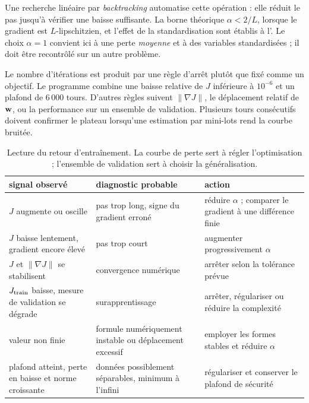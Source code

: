 Une recherche linéaire par \emph{backtracking} automatise cette opération : elle
réduit le pas jusqu'à vérifier une baisse suffisante. La borne théorique
$\alpha<2/L$, lorsque le gradient est $L$-lipschitzien, et l'effet de la
standardisation sont établis à l'. Le choix
$\alpha=1$ convient ici à une perte \emph{moyenne} et à des variables
standardisées ; il doit être recontrôlé sur un autre problème.

Le nombre d'itérations est produit par une règle d'arrêt plutôt que fixé comme
un objectif. Le programme combine une baisse relative de $J$ inférieure à
$10^{-6}$ et un plafond de $6\,000$ tours. D'autres règles suivent
$\|\nabla J\|$, le déplacement relatif de $\mathbf{w}$, ou la performance sur un
ensemble de validation. Plusieurs tours consécutifs doivent confirmer le
plateau lorsqu'une estimation par mini-lots rend la courbe bruitée.

\begin{table}[htbp]
\centering
\small
\begin{tabularx}{\textwidth}{
  >{\raggedright\arraybackslash}p{43mm}
  >{\raggedright\arraybackslash}p{53mm}
  >{\raggedright\arraybackslash}X}
\toprule
signal observé & diagnostic probable & action \\
\midrule
$J$ augmente ou oscille &
  pas trop long, signe du gradient erroné &
  réduire $\alpha$ ; comparer le gradient à une différence finie \\
$J$ baisse lentement, gradient encore élevé &
  pas trop court &
  augmenter progressivement $\alpha$ \\
$J$ et $\|\nabla J\|$ se stabilisent &
  convergence numérique &
  arrêter selon la tolérance prévue \\
$J_{\rm train}$ baisse, mesure de validation se dégrade &
  surapprentissage &
  arrêter, régulariser ou réduire la complexité \\
valeur non finie &
  formule numériquement instable ou déplacement excessif &
  employer les formes stables et réduire $\alpha$ \\
plafond atteint, perte en baisse et norme croissante &
  données possiblement séparables, minimum à l'infini &
  régulariser et conserver le plafond de sécurité \\
\bottomrule
\end{tabularx}
\caption{Lecture du retour d'entraînement. La courbe de perte sert à régler
l'optimisation ; l'ensemble de validation sert à choisir la généralisation.}
\label{tab:diagnostic-descente}
\end{table}

